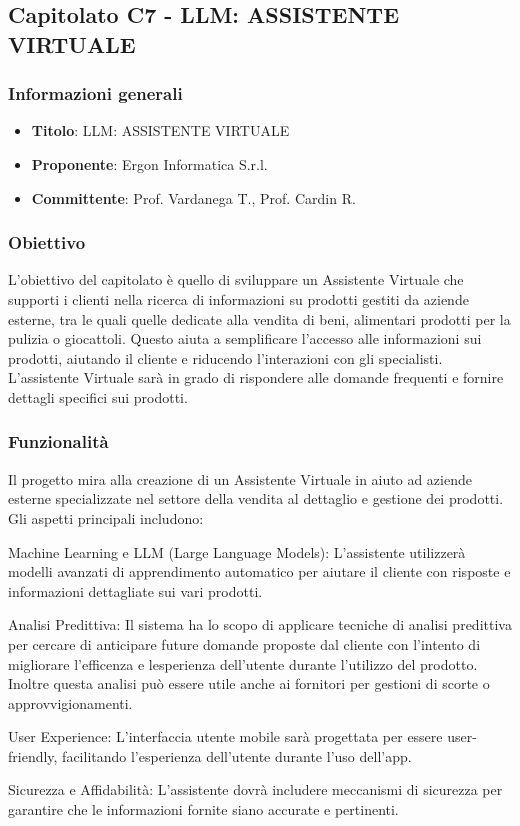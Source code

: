 \subsection{Capitolato C7 - LLM: ASSISTENTE VIRTUALE}
     \subsubsection{Informazioni generali}
        \begin{itemize}
            \item \textbf{Titolo}: LLM: ASSISTENTE VIRTUALE
            \item \textbf{Proponente}: Ergon Informatica S.r.l.
            \item \textbf{Committente}: Prof. Vardanega T., Prof. Cardin R.
        \end{itemize}
    \subsubsection{Obiettivo}
    L’obiettivo del capitolato è quello di sviluppare un Assistente Virtuale che supporti i clienti nella ricerca di informazioni su prodotti gestiti da aziende esterne, tra le quali quelle dedicate alla vendita di beni, alimentari prodotti per la pulizia o giocattoli. Questo aiuta a semplificare l’accesso alle informazioni sui prodotti, aiutando il cliente e riducendo l’interazioni con gli specialisti. L’assistente Virtuale sarà in grado di rispondere alle domande frequenti  e fornire dettagli specifici sui prodotti.
    \subsubsection{Funzionalità}
    Il progetto mira alla creazione di un Assistente Virtuale in aiuto ad aziende esterne specializzate nel settore della vendita al dettaglio e gestione dei prodotti. Gli aspetti principali includono:
    \begin{itemsize}
        \item Machine Learning e LLM (Large Language Models): L'assistente utilizzerà modelli avanzati di apprendimento automatico per aiutare il cliente con risposte e informazioni dettagliate sui vari prodotti.
        \item Analisi Predittiva: Il sistema ha lo scopo di applicare tecniche di analisi predittiva per cercare di anticipare future domande proposte dal cliente con l’intento di migliorare l’efficenza e lesperienza dell’utente durante l’utilizzo del prodotto. Inoltre questa analisi può essere utile anche ai fornitori per gestioni di scorte o approvvigionamenti.
        \item User Experience: L'interfaccia utente mobile sarà progettata per essere user-friendly, facilitando l’esperienza dell’utente durante l’uso dell’app.
        \item Sicurezza e Affidabilità: L'assistente dovrà includere meccanismi di sicurezza per garantire che le informazioni fornite siano accurate e pertinenti.
    \end{itemsize}
